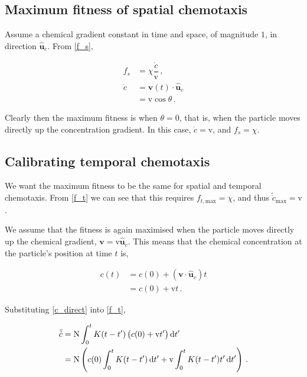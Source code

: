 \documentclass[a4wide,11pt]{article}
\begin{document}
\subsection*{Maximum fitness of spatial chemotaxis}

Assume a chemical gradient constant in time and space, of magnitude $1$, in direction $\hat{\mathbf{u}}_c$. From \cref{f_s},


\begin{equation}
    \begin{aligned}
        f_s     &= \chi \dfrac{\dot{c}}{\mathrm{v}} \,, \\
        \dot{c} &= \mathbf{v}(t) \cdot \hat{\mathbf{u}}_c \\
                &= \mathrm{v} \cos \theta \,.
    \end{aligned}
    \label{f_s_uni}
\end{equation}

Clearly then the maximum fitness is when $\theta = 0$, that is, when the particle moves directly up the concentration gradient. In this case, $\dot{c} = \mathrm{v}$, and $f_s = \chi$.

\subsection*{Calibrating temporal chemotaxis}

We want the maximum fitness to be the same for spatial and temporal chemotaxis. From \cref{f_t} we can see that this requires $f_{t,\mathrm{max}} = \chi$, and thus $\tilde{\dot{c}}_\mathrm{max} = \mathrm{v}$.

We assume that the fitness is again maximised when the particle moves directly up the chemical gradient, $\mathbf{v} = \mathrm{v} \hat{\mathbf{u}}_c$. This means that the chemical concentration at the particle's position at time $t$ is,

\begin{equation}
    \begin{aligned}
        c(t) &= c(0) + (\mathbf{v} \cdot \hat{\mathbf{u}}_c) t \\
             &= c(0) + \mathrm{v} t \,.
    \end{aligned}
    \label{c_direct}
\end{equation}

Substituting \cref{c_direct} into \cref{f_t},

\begin{equation}
    \begin{aligned}
        \tilde{\dot{c}} &= \mathrm{N} \int_0^t K(t - t') \del{ c(0) + \mathrm{v} t' } \dif t' \\
                        &= \mathrm{N} \del{ c(0) \int_0^t K(t - t') \dif t' + \mathrm{v} \int_0^t K(t - t') t' \dif t' } \,.
    \end{aligned}
    \label{f_t_uni}
\end{equation}
\end{document}
